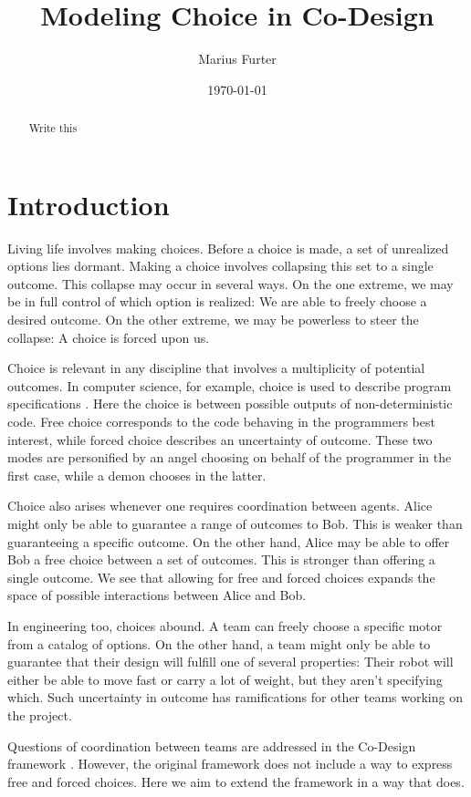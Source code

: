 \documentclass[12pt]{article}
\title{Modeling Choice in Co-Design}
\author{Marius Furter}
\date{\today}
\theoremstyle{definition}
\theoremstyle{plain}
\theoremstyle{plain}
\theoremstyle{plain}
\theoremstyle{plain}
\theoremstyle{remark}
\theoremstyle{remark}
\begin{document}
\maketitle

\begin{abstract}
	Write this
\end{abstract}
\newpage
\tableofcontents
\newpage

\section{Introduction}
Living life involves making choices. Before a choice is made, a set of unrealized options lies dormant. Making a choice involves collapsing this set to a single outcome. This collapse may occur in several ways. On the one extreme, we may be in full control of which option is realized: We are able to freely choose a desired outcome. On the other extreme, we may be powerless to steer the collapse: A choice is forced upon us.

Choice is relevant in any discipline that involves a multiplicity of potential outcomes. In computer science, for example, choice is used to describe program specifications \cite{Martin2007,Morris2004}. Here the choice is between possible outputs of non-deterministic code. Free choice corresponds to the code behaving in the programmers best interest, while forced choice describes an uncertainty of outcome. These two modes are personified by an angel choosing on behalf of the programmer in the first case, while a demon chooses in the latter.

Choice also arises whenever one requires coordination between agents. Alice might only be able to guarantee a range of outcomes to Bob. This is weaker than guaranteeing a specific outcome. On the other hand, Alice may be able to offer Bob a free choice between a set of outcomes. This is stronger than offering a single outcome. We see that allowing for free and forced choices expands the space of possible interactions between Alice and Bob.

In engineering too, choices abound. A team can freely choose a specific motor from a catalog of options. On the other hand, a team might only be able to guarantee that their design will fulfill one of several properties: Their robot will either be able to move fast or carry a lot of weight, but they aren't specifying which. Such uncertainty in outcome has ramifications for other teams working on the project. 

Questions of coordination between teams are addressed in the Co-Design framework \cite{Censi2015}. However, the original framework does not include a way to express free and forced choices. Here we aim to extend the framework in a way that does. 
\end{document}
